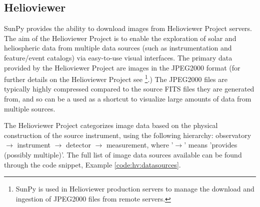 \subsection{Helioviewer}\label{ssec:hv}

SunPy provides the ability to download images from Helioviewer Project
servers.  The aim of the Helioviewer Project is to enable the
exploration of solar and heliospheric data from multiple data sources
(such as instrumentation and feature/event catalogs) via easy-to-use
visual interfaces.  The primary data provided by the Helioviewer
Project are images in the JPEG2000 format (for further details on the
Helioviewer Project see \cite{}\footnote{SunPy is used in Helioviewer
  production servers to manage the download and ingestion of JPEG2000
  files from remote servers.}.)  The JPEG2000 files are typically
highly compressed compared to the source FITS files they are generated
from, and so can be a used as a shortcut to visualize large amounts of
data from multiple sources.

The Helioviewer Project categorizes image data based on the physical
construction of the source instrument, using the following hierarchy:
observatory $\rightarrow$ instrument $\rightarrow$ detector
$\rightarrow$ measurement, where '$\rightarrow$' means 'provides
(possibly multiple)'.  The full list of image data sources available
can be found through the code snippet, Example
\ref{code:hv:datasources}.

